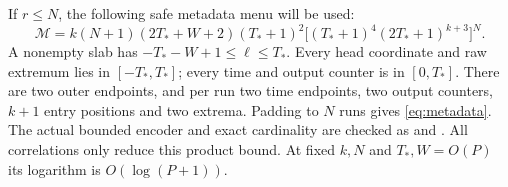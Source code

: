 If $r\le N$, the following safe metadata menu will be used:
\begin{equation}\label{eq:metadata}
 \mathcal M=k(N+1)(2T_*+W+2)(T_*+1)^2
 \bigl[(T_*+1)^4(2T_*+1)^{k+3}\bigr]^N.
\end{equation}
A nonempty slab has $-T_*-W+1\le\ell\le T_*$. Every head coordinate and
raw extremum lies in $[-T_*,T_*]$; every time and output counter is in
$[0,T_*]$. There are two outer endpoints, and per run two time endpoints,
two output counters, $k+1$ entry positions and two extrema. Padding to $N$
runs gives \cref{eq:metadata}. The actual bounded encoder and exact
cardinality are checked as  and
. All correlations only reduce this product
bound. At fixed $k,N$ and $T_*,W=O(P)$ its logarithm is $O(\log(P+1))$.
